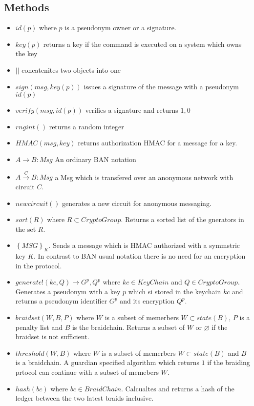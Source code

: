 \documentclass[12pt]{article}
\begin{document}
\subsection*{Methods}

\begin{itemize}
\item $id(p)$ where $p$ is a pseudonym owner or a signature.
\item $key(p)$ returns a key if the command is executed on a system which owns the key
\item $||$ concatenites two objects into one
\item $sign(msg, key(p))$ issues a signature of the message with a pseudonym $id(p)$
\item $verify(msg, id(p))$ verifies a signature and returns ${1, 0}$ 
\item $rngint()$ returns a random integer
\item $HMAC(msg, key)$ returns authorization HMAC for a message for a key.
\item $A \to B: Msg$ An ordinary BAN notation
\item $A \overset{C}{\to} B: Msg$ a Msg which is transfered over an anonymous network with circuit $C$.
\item $newcircuit()$ generates a new circuit for anonymous messaging.
\item $sort(R)$ where $R \subset CryptoGroup$. Returns a sorted list of the gnerators in the set $R$.
\item $\left\{ MSG \right\}_K$. Sends a message which is HMAC authorized with a symmstric key $K$. In contrast to BAN usual notation there is no need for an encryption in the protocol.
\item $generate!(kc, Q) \to G^p, Q^p$ where $kc \in KeyChain$ and $Q \in CryptoGroup$. Generates a pseudonym with a key $p$ which si stored in the keychain $kc$ and returns a pseudonym identifier $G^p$ and its encryption $Q^p$. 
\item $braidset(W, B, P)$ where $W$ is a subset of memerbers $W \subset state(B)$, $P$ is a penalty list and $B$ is the braidchain. Returns a subset of $W$ or $\varnothing$ if the braidset is not sufficient.
\item $threshold(W, B)$ where $W$ is a subset of memerbers $W \subset state(B)$ and $B$ is a braidchain. A guardian specified algorithm which returns $1$ if the braiding prtocol can continue with a subset of memebers $W$.
\item $hash(bc)$ where $bc \in BraidChain$. Calcualtes and returns a hash of the ledger between the two latest braids inclusive.
\end{itemize}
\end{document}
